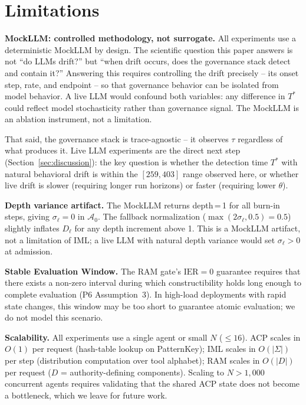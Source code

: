 \documentclass[11pt]{article}
\newcommand{\Azero}{\mathcal{A}_0}
\newcommand{\IER}{\mathrm{IER}}
\begin{document}
\section{Limitations}
\label{sec:limits}

\textbf{MockLLM: controlled methodology, not surrogate.}
All experiments use a deterministic MockLLM by design.
The scientific question this paper answers is not ``do LLMs drift?'' but
``when drift occurs, does the governance stack detect and contain it?''
Answering this requires controlling the drift precisely -- its onset step,
rate, and endpoint -- so that governance behavior can be isolated from
model behavior.
A live LLM would confound both variables: any difference in $T^*$ could
reflect model stochasticity rather than governance signal.
The MockLLM is an ablation instrument, not a limitation.

That said, the governance stack is trace-agnostic -- it observes $\tau$
regardless of what produces it.
Live LLM experiments are the direct next step (Section~\ref{sec:discussion}):
the key question is whether the detection time $T^*$ with natural behavioral
drift is within the $[259, 403]$ range observed here, or whether live drift
is slower (requiring longer run horizons) or faster (requiring lower $\theta$).

\textbf{Depth variance artifact.}
The MockLLM returns depth\,=\,1 for all burn-in steps, giving
$\sigma_\ell = 0$ in $\Azero$.
The fallback normalization ($\max(2\sigma_\ell, 0.5) = 0.5$) slightly
inflates $D_\ell$ for any depth increment above 1.
This is a MockLLM artifact, not a limitation of IML; a live LLM with
natural depth variance would set $\sigma_\ell > 0$ at admission.

\textbf{Stable Evaluation Window.}
The RAM gate's $\IER=0$ guarantee requires that there exists a non-zero
interval during which constructibility holds long enough to complete
evaluation (P6 Assumption~3).
In high-load deployments with rapid state changes, this window may be
too short to guarantee atomic evaluation; we do not model this scenario.

\textbf{Scalability.}
All experiments use a single agent or small $N$ ($\leq 16$).
ACP scales in $O(1)$ per request (hash-table lookup on PatternKey);
IML scales in $O(|\Sigma|)$ per step (distribution computation over tool alphabet);
RAM scales in $O(|D|)$ per request ($D$ = authority-defining components).
Scaling to $N > 1{,}000$ concurrent agents requires validating that
the shared ACP state does not become a bottleneck, which we leave for future work.
\end{document}
